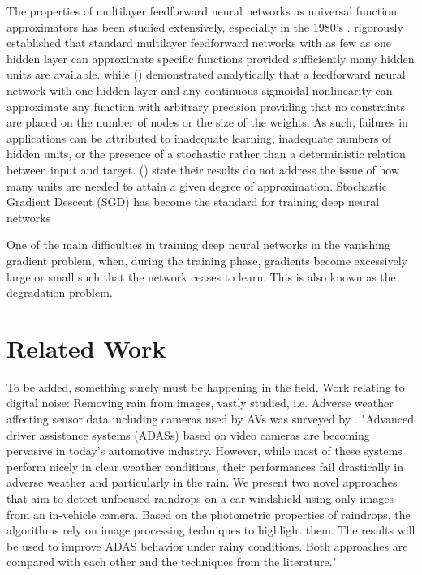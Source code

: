 The properties of multilayer feedforward neural networks as universal function approximators has been studied extensively, especially in the 1980's . \cite{hornik1989multilayer} rigorously established that standard multilayer feedforward networks with as few as one hidden layer can approximate specific functions provided sufficiently many hidden units are available. while (\cite{cybenko1989approximation}) demonstrated analytically that a feedforward neural network with one hidden layer and any continuous sigmoidal nonlinearity can approximate any function with arbitrary precision providing that
no constraints are placed on the number of nodes or the size of the weights. As such, failures in applications can be attributed to inadequate learning, inadequate numbers of hidden units, or the presence of a  stochastic rather than a deterministic relation between input and target. (\cite{hornik1989multilayer}) state their results do not address the issue of how many units are needed to attain a  given degree of approximation.  
Stochastic Gradient Descent (SGD) has become the standard for training deep neural networks

One of the main difficulties in training deep neural networks in the vanishing gradient problem, when, during the training phase, gradients become excessively large or small such that the network ceases to learn. This is also known as the degradation problem. 

\section{Related Work}
To be added, something surely must be happening in the field.
Work relating to digital noise:
Removing rain from images, vastly studied, i.e.
Adverse weather affecting sensor data including cameras used by AVs was surveyed by \cite{ZangAdverseWetherAVSurvey8666747}.  
\cite{ClearingSkiesDeepNNRainRemoval7893758}
\cite{Cord2014DetectingUR} "Advanced driver assistance systems (ADASs) based on video cameras are becoming pervasive in today's automotive industry. However, while most of these systems perform nicely in clear weather conditions, their performances fail drastically in adverse weather and particularly in the rain. We present two novel approaches that aim to detect unfocused raindrops on a car windshield using only images from an in-vehicle camera. Based on the photometric properties of raindrops, the algorithms rely on image processing techniques to highlight them. The results will be used to improve ADAS behavior under rainy conditions. Both approaches are compared with each other and the techniques from the literature."

